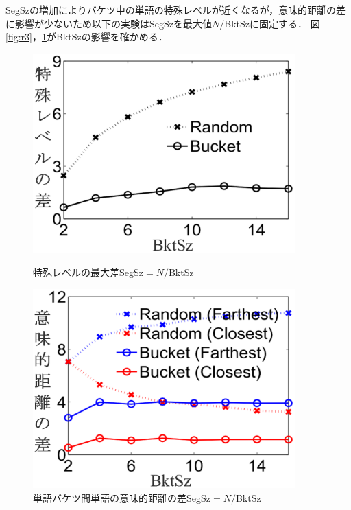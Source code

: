 \documentclass{jsarticle}
\theoremstyle{definition}
\begin{document}
SegSzの増加によりバケツ中の単語の特殊レベルが近くなるが，意味的距離の差に影響が少ないため以下の実験はSegSzを最大値$N/$BktSzに固定する．
図\ref{fig:r3}，\ref{fig:r4}がBktSzの影響を確かめる．

\begin{figure}
\begin{minipage}[t]{0.5\linewidth}
\centering
\includegraphics[width=0.9\textwidth]{rk19.eps}
\caption{特殊レベルの最大差SegSz$=N/$BktSz}
\label{fig:r3}
\end{minipage}%
\begin{minipage}[t]{0.5\linewidth}
\centering
\includegraphics[width=0.9\textwidth]{rk20.eps}
\caption{単語バケツ間単語の意味的距離の差SegSz$=N/$BktSz}
\label{fig:r4}
\end{minipage}
\end{figure}
\end{document}
